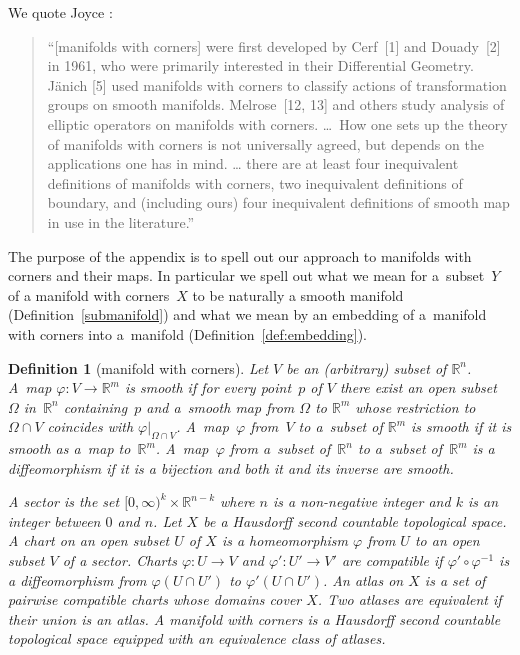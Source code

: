 \documentclass[pdftex]{sigma}
\numberwithin{equation}{section}
\newtheorem{Definition}[Lemma]{Definition}
\begin{document}
We quote Joyce \cite{Joyce}:
\begin{quote}
  ``[manifolds with corners] were f\/irst developed by Cerf~[1] and Douady~[2] in 1961, who were primarily interested in their
  Dif\/ferential Geometry. J\"anich [5] used manifolds with corners to
  classify actions of transformation groups on smooth manifolds.
  Melrose~[12, 13] and others study analysis of elliptic operators on
  manifolds with corners.
  \ldots\
  How one sets up
  the theory of manifolds with corners is not universally agreed, but
  depends on the applications one has in mind. \ldots
  there are at least four inequivalent def\/initions of manifolds with
  corners, two inequivalent def\/initions of boundary, and (including
  ours) four inequivalent def\/initions of smooth map in use in the
  literature.''
\end{quote}
The purpose of the appendix is to spell out our approach to manifolds
with corners and their maps.  In particular we spell out what we mean
for a~subset~$Y$ of a manifold with corners~$X$ to be naturally a
smooth manifold (Def\/inition~\ref{submanifold}) and what we mean by an
embedding of a~manifold with corners into a~manifold
(Def\/inition~\ref{def:embedding}).


\begin{Definition}[manifold with corners] \label{md w corners}\sloppy
Let $V$ be an (arbitrary) subset of ${\mathbb R}^n$.  A~map \mbox{$\varphi \colon V \to {\mathbb R}^m$}
is \emph{smooth} if for every point~$p$ of $V$ there exist
an open subset~$\Omega$ in~${\mathbb R}^n$ containing~$p$ and a~smooth map
from $\Omega$ to ${\mathbb R}^m$ whose restriction to~$\Omega \cap V$
coincides with $\varphi|_{\Omega \cap V}$.
A~map~$\varphi$ from~$V$ to a~subset of ${\mathbb R}^m$ is \emph{smooth}
if it is smooth as a~map to~${\mathbb R}^m$.  A~map~$\varphi$ from a~subset
of~${\mathbb R}^n$ to a~subset of~${\mathbb R}^m$ is a \emph{diffeomorphism}
if it is a bijection and both it and its inverse are smooth.

A \emph{sector} is the set $[0,\infty)^k \times {\mathbb R}^{n-k}$
where $n$ is a non-negative integer and $k$ is an integer between $0$ and $n$.
Let $X$ be a Hausdorf\/f second countable topological space.
A \emph{chart} on an open subset $U$ of $X$ is a homeomorphism $\varphi$
from $U$ to an open subset $V$ of a sector.
Charts $\varphi \colon U \to V$ and $\varphi' \colon U' \to V'$
are \emph{compatible} if $\varphi' \circ \varphi^{-1}$ is
a dif\/feomorphism from $\varphi(U \cap U')$ to $\varphi'(U \cap U')$.
An \emph{atlas} on $X$ is a set of pairwise compatible charts
whose domains cover $X$. Two atlases are \emph{equivalent}
if their union is an atlas.
A \emph{manifold with corners} is a Hausdorf\/f second countable
topological space equipped with an equivalence class of atlases.
\end{Definition}
\end{document}
